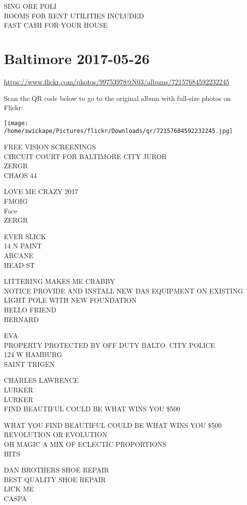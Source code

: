 \documentclass[10pt,letterpaper]{article}
\begin{document}
SING ORE POLI\\
ROOMS FOR RENT UTILITIES INCLUDED\\
FAST CA\$H FOR YOUR HOUSE


\section*{Baltimore 2017-05-26}

\url{https://www.flickr.com/photos/99753978@N03/albums/72157684592232245}

Scan the QR code below to go to the original album with full-size photos on Flickr:

\texttt{[image: /home/swickape/Pictures/flickr/Downloads/qr/72157684592232245.jpg]}


FREE VISION SCREENINGS\\
CIRCUIT COURT FOR BALTIMORE CITY JUROR\\
ZERGR\\
CHAOS 44

LOVE ME CRAZY 2017\\
FMOIG\\
Face\\
ZERGR

EVER SLICK\\
14 N PAINT\\
ARCANE\\
HEAD ST

LITTERING MAKES ME CRABBY\\
NOTICE PROVIDE AND INSTALL NEW DAS EQUIPMENT ON EXISTING LIGHT POLE WITH NEW FOUNDATION\\
HELLO FRIEND\\
BERNARD

EVA\\
PROPERTY PROTECTED BY OFF DUTY BALTO. CITY POLICE\\
124 W HAMBURG\\
SAINT TRIGEN

CHARLES LAWRENCE\\
LURKER\\
LURKER\\
FIND BEAUTIFUL COULD BE WHAT WINS YOU \$500

WHAT YOU FIND BEAUTIFUL COULD BE WHAT WINS YOU \$500\\
REVOLUTION OR EVOLUTION\\
OH MAGIC A MIX OF ECLECTIC PROPORTIONS\\
HITS

DAN BROTHERS SHOE REPAIR\\
BEST QUALITY SHOE REPAIR\\
LICK ME\\
CASPA
\end{document}
